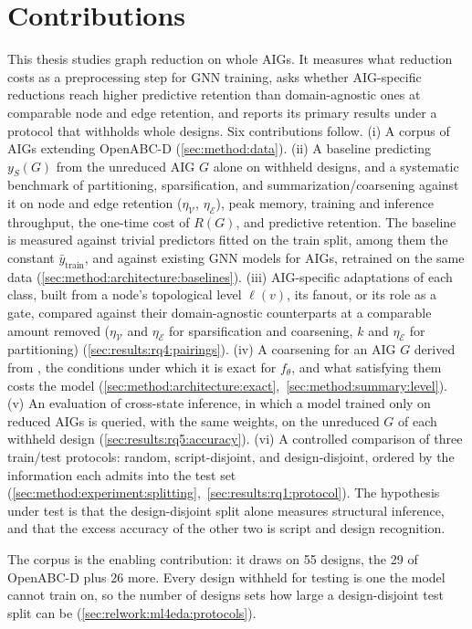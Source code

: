 \section{Contributions}
\label{sec:intro:contributions}
This thesis studies graph reduction on whole AIGs. It measures what reduction costs as a
preprocessing step for GNN training, asks whether AIG-specific reductions reach higher
predictive retention than domain-agnostic ones at comparable node and edge retention, and
reports its primary results under a protocol that withholds whole designs.
Six contributions follow. (i) A corpus of AIGs extending OpenABC-D
\citep{chowdhury2021openabc} (\ref{sec:method:data}). (ii) A baseline predicting $y_S(G)$
from the unreduced AIG $G$ alone on withheld designs, and a systematic benchmark of
partitioning, sparsification, and summarization/coarsening against it on node and edge retention
($\eta_{\mathcal{V}}$, $\eta_{\mathcal{E}}$), peak memory, training and inference throughput,
the one-time cost of $R(G)$, and predictive retention. The baseline is measured against
trivial predictors fitted on the train split, among them the constant
$\bar{y}_{\text{train}}$, and against existing GNN models for AIGs, retrained on the
same data (\ref{sec:method:architecture:baselines}).
(iii) AIG-specific adaptations of each class, built from a node's topological level
$\ell(v)$, its fanout, or its role as a gate, compared against their domain-agnostic
counterparts at a comparable amount removed ($\eta_{\mathcal{V}}$ and $\eta_{\mathcal{E}}$ for
sparsification and coarsening, $k$ and $\eta_{\mathcal{E}}$ for partitioning)
(\ref{sec:results:rq4:pairings}). (iv) A coarsening for an AIG $G$ derived from
\citet{bollen2023exact}, the conditions under which it is exact for $f_\theta$, and what
satisfying them costs the model
(\ref{sec:method:architecture:exact},~\ref{sec:method:summary:level}).
(v) An evaluation of cross-state inference, in which a model
trained only on reduced AIGs is queried, with the same weights, on the unreduced $G$ of each
withheld design (\ref{sec:results:rq5:accuracy}). (vi) A controlled comparison of three
train/test protocols: random, script-disjoint, and design-disjoint, ordered by the
information each admits into the test set
(\ref{sec:method:experiment:splitting},~\ref{sec:results:rq1:protocol}). The hypothesis under
test is that the design-disjoint split alone measures structural inference, and that the
excess accuracy of the other two is script and design recognition.

The corpus is the enabling contribution: it draws on 55 designs, the 29 of OpenABC-D plus 26
more. Every design withheld for testing is one the model cannot train on, so the number of
designs sets how large a design-disjoint test split can be
(\ref{sec:relwork:ml4eda:protocols}).

